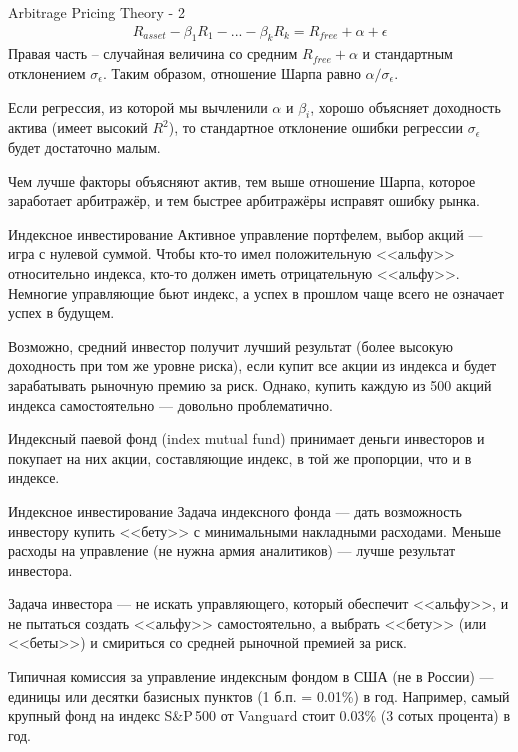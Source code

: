 \documentclass{beamer}
\begin{document}
\begin{frame}{Arbitrage Pricing Theory - 2}
\justify
\begin{align*}
R_{asset} - \beta_1 R_{1} - ... - \beta_k R_k = R_{free} + \alpha + \epsilon
\end{align*}
Правая часть -- случайная величина со средним $R_{free} + \alpha$ и стандартным отклонением $\sigma_{\epsilon}$. Таким образом, отношение Шарпа равно $\alpha / \sigma_{\epsilon}$.

\vspace{\baselineskip}
Если регрессия, из которой мы вычленили $\alpha$ и $\beta_i$, хорошо объясняет доходность актива (имеет высокий $R^2$), то стандартное отклонение ошибки регрессии $\sigma_\epsilon$ будет достаточно малым.

\vspace{\baselineskip}
Чем лучше факторы объясняют актив, тем выше отношение Шарпа, которое заработает арбитражёр, и тем быстрее арбитражёры исправят ошибку рынка.
\end{frame}



\begin{frame}{Индексное инвестирование}
\justify
Активное управление портфелем, выбор акций --- игра с нулевой суммой. Чтобы кто-то имел положительную <<альфу>> относительно индекса, кто-то должен иметь отрицательную <<альфу>>. Немногие управляющие бьют индекс, а успех в прошлом чаще всего не означает успех в будущем.

\vspace{\baselineskip}
Возможно, средний инвестор получит лучший результат (более высокую доходность при том же уровне риска), если купит все акции из индекса и будет зарабатывать рыночную премию за риск. Однако, купить каждую из 500 акций индекса самостоятельно --- довольно проблематично.

\vspace{\baselineskip}
Индексный паевой фонд (index mutual fund) принимает деньги инвесторов и покупает на них акции, составляющие индекс, в той же пропорции, что и в индексе.
\end{frame}



\begin{frame}{Индексное инвестирование}
\justify
Задача индексного фонда --- дать возможность инвестору купить <<бету>> с минимальными накладными расходами. Меньше расходы на управление (не нужна армия аналитиков) --- лучше результат инвестора.

\vspace{\baselineskip}
Задача инвестора --- не искать управляющего, который обеспечит <<альфу>>, и не пытаться создать <<альфу>> самостоятельно, а выбрать <<бету>> (или <<беты>>) и смириться со средней рыночной премией за риск.


\vspace{\baselineskip}
Типичная комиссия за управление индексным фондом в США (не в России) --- единицы или десятки базисных пунктов (1 б.п. = 0.01\%) в год. Например, самый крупный фонд на индекс S\&P\,500 от Vanguard стоит 0.03\% (3 сотых процента) в год.
\end{frame}
\end{document}

